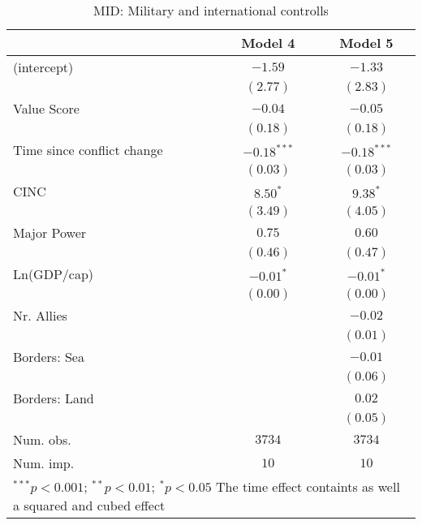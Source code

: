 
\begin{table}
\begin{center}
\begin{tabular}{l c c}
\toprule
 & Model 4 & Model 5 \\
\midrule
(intercept)                & $-1.59$       & $-1.33$       \\
                           & $(2.77)$      & $(2.83)$      \\
Value Score                & $-0.04$       & $-0.05$       \\
                           & $(0.18)$      & $(0.18)$      \\
Time since conflict change & $-0.18^{***}$ & $-0.18^{***}$ \\
                           & $(0.03)$      & $(0.03)$      \\
CINC                       & $8.50^{*}$    & $9.38^{*}$    \\
                           & $(3.49)$      & $(4.05)$      \\
Major Power                & $0.75$        & $0.60$        \\
                           & $(0.46)$      & $(0.47)$      \\
Ln(GDP/cap)                & $-0.01^{*}$   & $-0.01^{*}$   \\
                           & $(0.00)$      & $(0.00)$      \\
Nr. Allies                 &               & $-0.02$       \\
                           &               & $(0.01)$      \\
Borders: Sea               &               & $-0.01$       \\
                           &               & $(0.06)$      \\
Borders: Land              &               & $0.02$        \\
                           &               & $(0.05)$      \\
\midrule
Num. obs.                  & $3734$        & $3734$        \\
Num. imp.                  & $10$          & $10$          \\
\bottomrule
\multicolumn{3}{l}{\scriptsize{$^{***}p<0.001$; $^{**}p<0.01$; $^{*}p<0.05$ 
 The time effect containts as well a squared and cubed effect}}
\end{tabular}
\caption{MID: Military and international controlls}
\label{MID_2}
\end{center}
\end{table}
